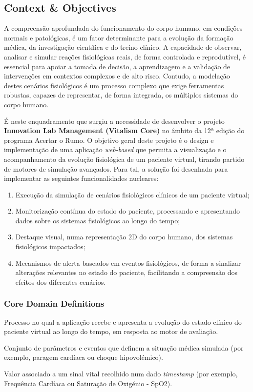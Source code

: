 \documentclass[11pt,a4paper]{article}
\begin{document}
\subsection{Context \& Objectives}
A compreensão aprofundada do funcionamento do corpo humano, em condições normais e patológicas, é um fator determinante para a evolução da formação médica, da investigação científica e do treino clínico. A capacidade de observar, analisar e simular reações fisiológicas reais, de forma controlada e reprodutível, é essencial para apoiar a tomada de decisão, a aprendizagem e a validação de intervenções em contextos complexos e de alto risco. Contudo, a modelação destes cenários fisiológicos é um processo complexo que exige ferramentas robustas, capazes de representar, de forma integrada, os múltiplos sistemas do corpo humano.

É neste enquadramento que surgiu a necessidade de desenvolver o projeto \textbf{Innovation Lab Management (Vitalism Core)} no âmbito da 12ª edição do programa Acertar o Rumo. O objetivo geral deste projeto é o design e implementação de uma aplicação \textit{web-based} que permita a visualização e o acompanhamento da evolução fisiológica de um paciente virtual, tirando partido de motores de simulação avançados. Para tal, a solução foi desenhada para implementar as seguintes funcionalidades nucleares:
\begin{enumerate}[label=\Roman*., parsep=0pt, topsep=4pt]
    \item Execução da simulação de cenários fisiológicos clínicos de um paciente virtual;
    \item Monitorização contínua do estado do paciente, processando e apresentando dados sobre os sistemas fisiológicos ao longo do tempo;
    \item Destaque visual, numa representação 2D do corpo humano, dos sistemas fisiológicos impactados;
    \item Mecanismos de alerta baseados em eventos fisiológicos, de forma a sinalizar alterações relevantes no estado do paciente, facilitando a compreensão dos efeitos dos diferentes cenários.
\end{enumerate}

\subsubsection*{Core Domain Definitions}
\begin{description}[style=nextline]
    \item[\color{accentblue}Simulação] Processo no qual a aplicação recebe e apresenta a evolução do estado clínico do paciente virtual ao longo do tempo, em resposta ao motor de avaliação.
    \item[\color{accentblue}Cenário Clínico] Conjunto de parâmetros e eventos que definem a situação médica simulada (por exemplo, paragem cardíaca ou choque hipovolémico).
    \item[\color{accentblue}Leitura Fisiológica] Valor associado a um sinal vital recolhido num dado \textit{timestamp} (por exemplo, Frequência Cardíaca ou Saturação de Oxigénio - SpO2).
\end{description}
\end{document}
